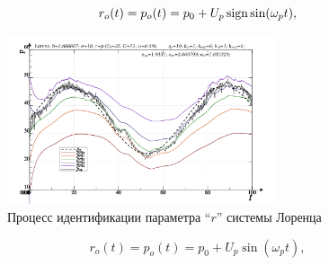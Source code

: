 \[
  r_o(t) = p_o(t) = p_0 +  U_{p} \operatorname*{sign} \sin( \omega_{p} t ),
\]


\begin{figure}[h!]
  \centerline{\includegraphics[width=0.7\textwidth]{p/cha/lor/lor_m5pf-pl_n_sin.png} }
  \caption{Процесс идентификации параметра ``$r$'' системы Лоренца}
  \label{atu:f:lor_id_mp5_sin}
\end{figure}

\[
  r_o(t) = p_o(t) = p_0 +  U_{p} \sin( \omega_{p} t ),
\]


